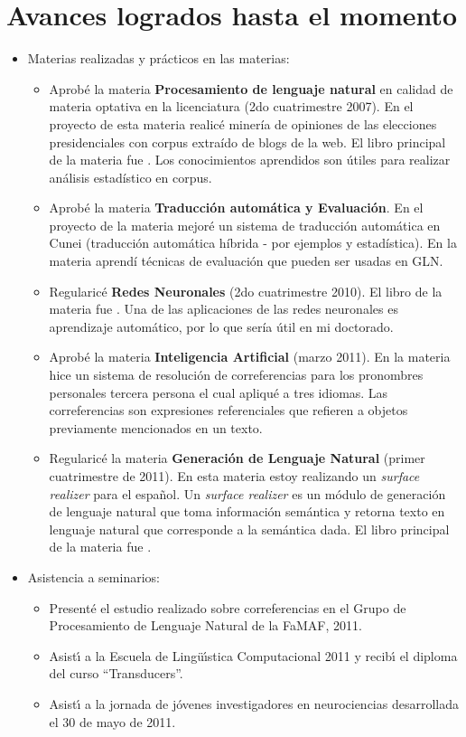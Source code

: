\section{Avances logrados hasta el momento}
\label{progreso}
\begin{itemize}
\item Materias realizadas y pr\'acticos en las materias:
\begin{itemize}
\item Aprob\'e la materia {\bf Procesamiento de lenguaje natural} en calidad de materia optativa en la licenciatura (2do cuatrimestre 2007). En el proyecto de esta materia realic\'e miner\'ia de opiniones de las elecciones presidenciales con corpus extra\'ido de blogs de la web. El libro principal de la materia fue \cite{Manning2000}. Los conocimientos aprendidos son \'utiles para realizar an\'alisis estad\'istico en corpus.
\item Aprob\'e la materia {\bf Traducci\'on autom\'atica y Evaluaci\'on}. En el proyecto de la materia mejor\'e un sistema de traducci\'on autom\'atica en Cunei (traducci\'on autom\'atica h\'ibrida - por ejemplos y estad\'istica).
En la materia aprend\'i t\'ecnicas de evaluaci\'on que pueden ser usadas en GLN. 
\item Regularic\'e {\bf Redes Neuronales} (2do cuatrimestre 2010). El libro de la materia fue \cite{Hertz1991}. Una de las aplicaciones de las redes neuronales es aprendizaje autom\'atico, por lo que ser\'ia \'util en mi doctorado.
\item Aprob\'e la materia {\bf Inteligencia Artificial} (marzo 2011). En la materia hice un sistema de resoluci\'on de correferencias para los pronombres personales tercera persona el cual apliqu\'e a tres idiomas. Las correferencias son expresiones referenciales que refieren a objetos previamente mencionados en un texto.
\item Regularic\'e la materia {\bf Generaci\'on de Lenguaje Natural} (primer cuatrimestre de 2011). En esta materia estoy realizando un {\it surface realizer} para el espa\~{n}ol. Un {\it surface realizer} es un m\'odulo de generaci\'on de lenguaje natural que toma informaci\'on sem\'antica y retorna texto en lenguaje natural que corresponde a la sem\'antica dada. El libro principal de la materia fue \cite{Reiter2000}.
\end{itemize}
\item Asistencia a seminarios:
\begin{itemize}
\item Present\'e el estudio realizado sobre correferencias en el Grupo de Procesamiento de Lenguaje Natural de la FaMAF, 2011.
\item Asist\'{\i} a la Escuela de Ling\"u\'{\i}stica Computacional 2011 y recib\'{\i} el diploma del curso ``Transducers''.
\item Asist\'{\i} a la jornada de j\'ovenes investigadores en neurociencias desarrollada el 30 de mayo de 2011.
\end{itemize}
\end{itemize}
